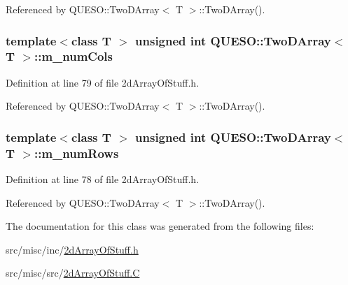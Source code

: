 Referenced by Q\-U\-E\-S\-O\-::\-Two\-D\-Array$<$ T $>$\-::\-Two\-D\-Array().

\hypertarget{class_q_u_e_s_o_1_1_two_d_array_adab8e60a3daa621f75681326478eb085}{
\subsubsection[{m\-\_\-num\-Cols}]{\setlength{\rightskip}{0pt plus 5cm}template$<$class T $>$ unsigned int {\bf Q\-U\-E\-S\-O\-::\-Two\-D\-Array}$<$ T $>$\-::m\-\_\-num\-Cols\hspace{0.3cm}{\ttfamily [private]}}}\label{class_q_u_e_s_o_1_1_two_d_array_adab8e60a3daa621f75681326478eb085}


Definition at line 79 of file 2d\-Array\-Of\-Stuff.\-h.



Referenced by Q\-U\-E\-S\-O\-::\-Two\-D\-Array$<$ T $>$\-::\-Two\-D\-Array().

\hypertarget{class_q_u_e_s_o_1_1_two_d_array_a26fc2685fae9aa7aa0fecfaa52e6c617}{
\subsubsection[{m\-\_\-num\-Rows}]{\setlength{\rightskip}{0pt plus 5cm}template$<$class T $>$ unsigned int {\bf Q\-U\-E\-S\-O\-::\-Two\-D\-Array}$<$ T $>$\-::m\-\_\-num\-Rows\hspace{0.3cm}{\ttfamily [private]}}}\label{class_q_u_e_s_o_1_1_two_d_array_a26fc2685fae9aa7aa0fecfaa52e6c617}


Definition at line 78 of file 2d\-Array\-Of\-Stuff.\-h.



Referenced by Q\-U\-E\-S\-O\-::\-Two\-D\-Array$<$ T $>$\-::\-Two\-D\-Array().



The documentation for this class was generated from the following files\-:\begin{DoxyCompactItemize}
\item 
src/misc/inc/\hyperlink{2d_array_of_stuff_8h}{2d\-Array\-Of\-Stuff.\-h}\item 
src/misc/src/\hyperlink{2d_array_of_stuff_8_c}{2d\-Array\-Of\-Stuff.\-C}\end{DoxyCompactItemize}
